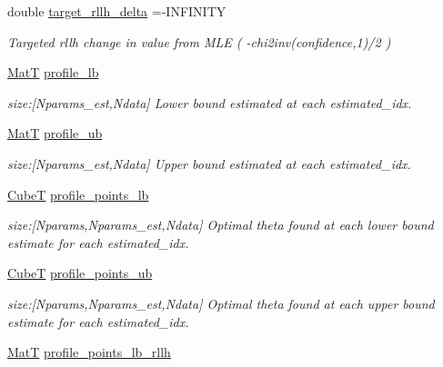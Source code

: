 \begin{DoxyCompactItemize}
double \hyperlink{structmappel_1_1estimator_1_1ProfileBoundsDataStack_a05d506b252e3e6ddc1a5036b60e8e854}{target\+\_\+rllh\+\_\+delta} =-\/I\+N\+F\+I\+N\+I\+TY
\begin{DoxyCompactList}\small\item\em Targeted rllh change in value from M\+LE ( -\/chi2inv(confidence,1)/2 ) \end{DoxyCompactList}\item 
\hyperlink{namespacemappel_a7091ab87c528041f7e2027195fad8915}{MatT} \hyperlink{structmappel_1_1estimator_1_1ProfileBoundsDataStack_ae37af08a6f31e748d44763a9fd83c5b1}{profile\+\_\+lb}
\begin{DoxyCompactList}\small\item\em size\+:\mbox{[}Nparams\+\_\+est,Ndata\mbox{]} Lower bound estimated at each estimated\+\_\+idx. \end{DoxyCompactList}\item 
\hyperlink{namespacemappel_a7091ab87c528041f7e2027195fad8915}{MatT} \hyperlink{structmappel_1_1estimator_1_1ProfileBoundsDataStack_ae9c006b881ba89bd13bb2a5368819dbe}{profile\+\_\+ub}
\begin{DoxyCompactList}\small\item\em size\+:\mbox{[}Nparams\+\_\+est,Ndata\mbox{]} Upper bound estimated at each estimated\+\_\+idx. \end{DoxyCompactList}\item 
\hyperlink{namespacemappel_ab2afab4e6c8805e83946670d882768c2}{CubeT} \hyperlink{structmappel_1_1estimator_1_1ProfileBoundsDataStack_ad5bd4f39d5046e582fe8be78567664af}{profile\+\_\+points\+\_\+lb}
\begin{DoxyCompactList}\small\item\em size\+:\mbox{[}Nparams,Nparams\+\_\+est,Ndata\mbox{]} Optimal theta found at each lower bound estimate for each estimated\+\_\+idx. \end{DoxyCompactList}\item 
\hyperlink{namespacemappel_ab2afab4e6c8805e83946670d882768c2}{CubeT} \hyperlink{structmappel_1_1estimator_1_1ProfileBoundsDataStack_a3839871c217f56c0d25a94a09130295d}{profile\+\_\+points\+\_\+ub}
\begin{DoxyCompactList}\small\item\em size\+:\mbox{[}Nparams,Nparams\+\_\+est,Ndata\mbox{]} Optimal theta found at each upper bound estimate for each estimated\+\_\+idx. \end{DoxyCompactList}\item 
\hyperlink{namespacemappel_a7091ab87c528041f7e2027195fad8915}{MatT} \hyperlink{structmappel_1_1estimator_1_1ProfileBoundsDataStack_a7d945ad7a7c73347babcde947b20515f}{profile\+\_\+points\+\_\+lb\+\_\+rllh}

\end{DoxyCompactItemize}
